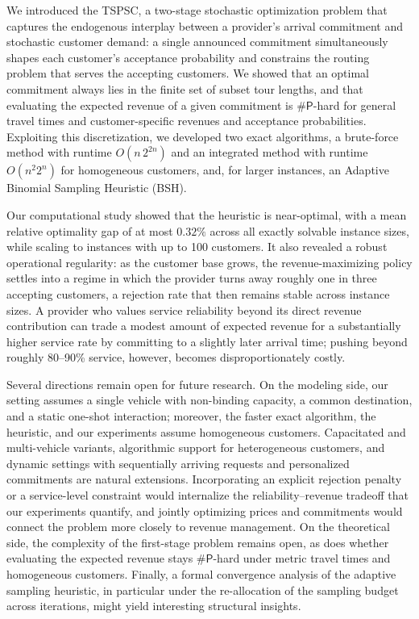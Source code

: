 \documentclass[11pt]{article}
\theoremstyle{plain}
\theoremstyle{definition}
\begin{document}
	We introduced the \ac{TSPSC}, a two-stage stochastic optimization problem that captures the endogenous interplay between a provider's arrival commitment and stochastic customer demand: a single announced commitment simultaneously shapes each customer's acceptance probability and constrains the routing problem that serves the accepting customers. We showed that an optimal commitment always lies in the finite set of subset tour lengths, and that evaluating the expected revenue of a given commitment is $\textsf{\#P}$-hard for general travel times and customer-specific revenues and acceptance probabilities. Exploiting this discretization, we developed two exact algorithms, a brute-force method with runtime $O(n\,2^{2n})$ and an integrated method with runtime $O(n^2 2^n)$ for homogeneous customers, and, for larger instances, an Adaptive Binomial Sampling Heuristic (BSH).

	Our computational study showed that the heuristic is near-optimal, with a mean relative optimality gap of at most $0.32\%$ across all exactly solvable instance sizes, while scaling to instances with up to 100 customers. It also revealed a robust operational regularity: as the customer base grows, the revenue-maximizing policy settles into a regime in which the provider turns away roughly one in three accepting customers, a rejection rate that then remains stable across instance sizes. A provider who values service reliability beyond its direct revenue contribution can trade a modest amount of expected revenue for a substantially higher service rate by committing to a slightly later arrival time; pushing beyond roughly 80--90\% service, however, becomes disproportionately costly.

	Several directions remain open for future research. On the modeling side, our setting assumes a single vehicle with non-binding capacity, a common destination, and a static one-shot interaction; moreover, the faster exact algorithm, the heuristic, and our experiments assume homogeneous customers. Capacitated and multi-vehicle variants, algorithmic support for heterogeneous customers, and dynamic settings with sequentially arriving requests and personalized commitments are natural extensions. Incorporating an explicit rejection penalty or a service-level constraint would internalize the reliability--revenue tradeoff that our experiments quantify, and jointly optimizing prices and commitments would connect the problem more closely to revenue management. On the theoretical side, the complexity of the first-stage problem remains open, as does whether evaluating the expected revenue stays $\textsf{\#P}$-hard under metric travel times and homogeneous customers. Finally, a formal convergence analysis of the adaptive sampling heuristic, in particular under the re-allocation of the sampling budget across iterations, might yield interesting structural insights.
\end{document}
